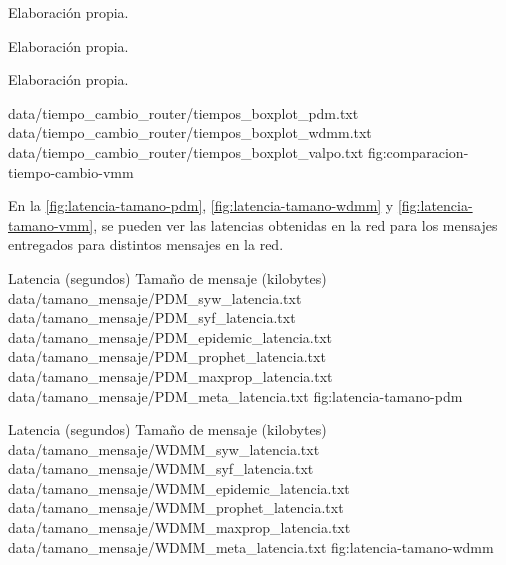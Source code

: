 {Elaboración propia.}


{Elaboración propia.}



{Elaboración propia.}


{
\boxplotTiempos
{data/tiempo_cambio_router/tiempos_boxplot_pdm.txt}
{data/tiempo_cambio_router/tiempos_boxplot_wdmm.txt}
{data/tiempo_cambio_router/tiempos_boxplot_valpo.txt}
}{fig:comparacion-tiempo-cambio-vmm}


En la \ref{fig:latencia-tamano-pdm}, \ref{fig:latencia-tamano-wdmm} y
\ref{fig:latencia-tamano-vmm}, se pueden ver las latencias obtenidas en la red
para los mensajes entregados para distintos mensajes en la red.

{
\graficoProtocolos
{Latencia (segundos)}
{Tamaño de mensaje (kilobytes)}
{data/tamano_mensaje/PDM_syw_latencia.txt}
{data/tamano_mensaje/PDM_syf_latencia.txt}
{data/tamano_mensaje/PDM_epidemic_latencia.txt}
{data/tamano_mensaje/PDM_prophet_latencia.txt}
{data/tamano_mensaje/PDM_maxprop_latencia.txt}
{data/tamano_mensaje/PDM_meta_latencia.txt}
}{fig:latencia-tamano-pdm}


{
\graficoProtocolos
{Latencia (segundos)}
{Tamaño de mensaje (kilobytes)}
{data/tamano_mensaje/WDMM_syw_latencia.txt}
{data/tamano_mensaje/WDMM_syf_latencia.txt}
{data/tamano_mensaje/WDMM_epidemic_latencia.txt}
{data/tamano_mensaje/WDMM_prophet_latencia.txt}
{data/tamano_mensaje/WDMM_maxprop_latencia.txt}
{data/tamano_mensaje/WDMM_meta_latencia.txt}
}{fig:latencia-tamano-wdmm}


